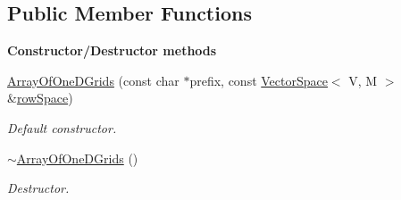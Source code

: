 \subsection*{Public Member Functions}
\begin{Indent}{\bf Constructor/\-Destructor methods}\par
\begin{DoxyCompactItemize}
\item 
\hyperlink{class_q_u_e_s_o_1_1_array_of_one_d_grids_afac2d38cfd5e69c4e7cd7744308063af}{Array\-Of\-One\-D\-Grids} (const char $\ast$prefix, const \hyperlink{class_q_u_e_s_o_1_1_vector_space}{Vector\-Space}$<$ V, M $>$ \&\hyperlink{class_q_u_e_s_o_1_1_array_of_one_d_grids_a07aee362e04f713c139730c991de9baa}{row\-Space})
\begin{DoxyCompactList}\small\item\em Default constructor. \end{DoxyCompactList}\item 
\hyperlink{class_q_u_e_s_o_1_1_array_of_one_d_grids_a4580db34a8438863e75c40cd47e9c8d4}{$\sim$\-Array\-Of\-One\-D\-Grids} ()
\begin{DoxyCompactList}\small\item\em Destructor. \end{DoxyCompactList}\end{DoxyCompactItemize}
\end{Indent}
